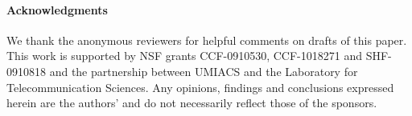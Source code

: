 \documentclass[natbib,10pt]{sigplanconf}
\begin{document}
\paragraph*{Acknowledgments} 

We thank the anonymous reviewers for helpful comments on drafts of
this paper.  This work is supported by NSF grants CCF-0910530,
CCF-1018271 and SHF-0910818 and the
partnership between UMIACS and the Laboratory for Telecommunication
Sciences.  Any opinions, findings and conclusions expressed herein are
the authors' and do not necessarily reflect those of the sponsors.



\balance




%
\end{document}
